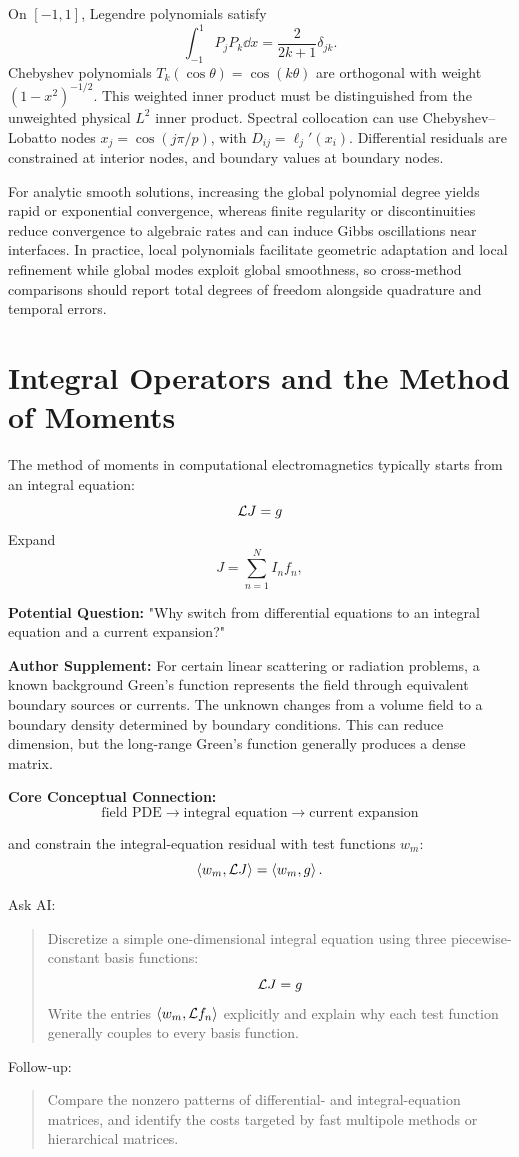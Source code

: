 On $[-1,1]$, Legendre polynomials satisfy
\[
\int_{-1}^1P_jP_k\dd x=\frac{2}{2k+1}\delta_{jk}.
\]
Chebyshev polynomials $T_k(\cos\theta)=\cos(k\theta)$
are orthogonal with weight $(1-x^2)^{-1/2}$. This weighted inner product must be distinguished from the unweighted physical $L^2$ inner product.
Spectral collocation can use Chebyshev--Lobatto nodes $x_j=\cos(j\pi/p)$,
with $D_{ij}=\ell_j'(x_i)$. Differential residuals are constrained at interior nodes, and boundary values at boundary nodes.

For analytic smooth solutions, increasing the global polynomial degree yields rapid or exponential convergence, whereas finite regularity or discontinuities reduce convergence to algebraic rates and can induce Gibbs oscillations near interfaces. In practice, local polynomials facilitate geometric adaptation and local refinement while global modes exploit global smoothness, so cross-method comparisons should report total degrees of freedom alongside quadrature and temporal errors.

\section{Integral Operators and the Method of Moments}
The method of moments in computational electromagnetics typically starts from an integral equation:
\[
\mathcal L J=g
\]
Expand
\[
J=\sum_{n=1}^N I_nf_n,
\]

\begin{authornote}
\textbf{Potential Question:}
"Why switch from differential equations to an integral equation and a current expansion?"

\textbf{Author Supplement:}
For certain linear scattering or radiation problems, a known background Green's function represents the field through equivalent boundary sources or currents. The unknown changes from a volume field to a boundary density determined by boundary conditions. This can reduce dimension, but the long-range Green's function generally produces a dense matrix.

\textbf{Core Conceptual Connection:}
\[
\text{field PDE}
\longrightarrow
\text{integral equation}
\longrightarrow
\text{current expansion}
\]
\end{authornote}

and constrain the integral-equation residual with test functions \(w_m\):
\[
\left\langle w_m,\mathcal L J\right\rangle
=
\left\langle w_m,g\right\rangle.
\]

\begin{askai}
Ask AI:
\begin{quote}
Discretize a simple one-dimensional integral equation using three piecewise-constant basis functions:
\[
\mathcal L J=g
\]
Write the entries \(\left\langle w_m,\mathcal L f_n\right\rangle\) explicitly and explain why each test function generally couples to every basis function.
\end{quote}

Follow-up:
\begin{quote}
Compare the nonzero patterns of differential- and integral-equation matrices, and identify the costs targeted by fast multipole methods or hierarchical matrices.
\end{quote}
\end{askai}

